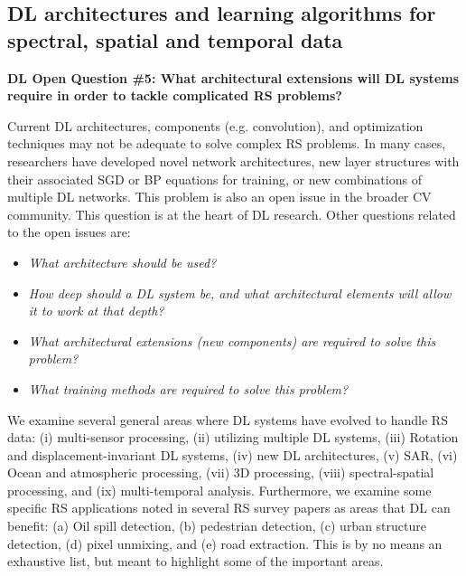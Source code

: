 \documentclass[12pt]{spieman}
\newcommand{\ParSection}[1]{}
\begin{document}
\begin{spacing}{1}
\subsection{DL architectures and learning algorithms for spectral, spatial and temporal data} \label{subsec:ChallengesOpportunities_v} 
\ParSection{Optimal architectures and architectural extensions}
\textbf{DL Open Question \#5: What architectural extensions will DL systems require in order to tackle complicated RS problems?} 

Current DL architectures, components (e.g. convolution), and optimization techniques may not be adequate to solve complex RS problems. In many cases, researchers have developed novel network architectures, new layer structures with their associated SGD or BP equations for training, or new combinations of multiple DL networks. This problem is also an open issue in the broader CV community. This question is at the heart of DL research. Other questions related to the open issues are:

\begin{itemize}
    \setlength{\parskip}{0pt}
    \setlength{\itemsep}{0pt plus 1pt}
    \item \textit{What architecture should be used?} 
    \item \textit{How deep should a DL system be, and what architectural elements will allow it to work at that depth?}
    \item \textit{What architectural extensions (new components) are required to solve this problem?}
    \item \textit{What training methods are required to solve this problem?}
\end{itemize}

We examine several general areas where DL systems have evolved to handle RS data: (i) multi-sensor processing, (ii) utilizing multiple DL systems, (iii) Rotation and displacement-invariant DL systems, (iv) new DL architectures, (v) SAR, (vi) Ocean and atmospheric processing, (vii) 3D processing,  (viii) spectral-spatial processing, and (ix) multi-temporal analysis. Furthermore, we examine some specific RS applications noted in several RS survey papers as areas that DL can benefit: (a) Oil spill detection, (b) pedestrian detection, (c) urban structure detection, (d) pixel unmixing, and (e) road extraction. This is by no means an exhaustive list, but meant to highlight some of the important areas.


\end{spacing}
\end{document}
